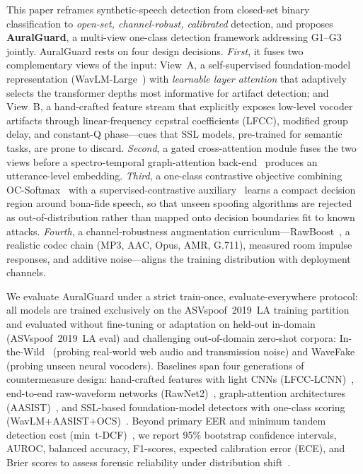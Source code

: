 This paper reframes synthetic-speech detection from closed-set binary classification to
\emph{open-set, channel-robust, calibrated} detection, and proposes
\textbf{AuralGuard}, a multi-view one-class detection framework addressing G1--G3
jointly. AuralGuard rests on four design decisions. \emph{First}, it fuses two
complementary views of the input: View~A, a self-supervised foundation-model
representation (WavLM-Large~\cite{chen2022wavlm}) with \emph{learnable layer attention}
that adaptively selects the transformer depths most informative for artifact detection;
and View~B, a hand-crafted feature stream that explicitly exposes low-level vocoder
artifacts through linear-frequency cepstral coefficients (LFCC), modified group delay,
and constant-Q phase---cues that SSL models, pre-trained for semantic tasks, are prone
to discard. \emph{Second}, a gated cross-attention module fuses the two views before a
spectro-temporal graph-attention back-end~\cite{jung2022aasist} produces an
utterance-level embedding. \emph{Third}, a one-class contrastive objective combining
OC-Softmax~\cite{zhang2021oneclass} with a supervised-contrastive
auxiliary~\cite{khosla2020supcon} learns a compact decision region around bona-fide
speech, so that unseen spoofing algorithms are rejected as out-of-distribution rather
than mapped onto decision boundaries fit to known attacks. \emph{Fourth}, a
channel-robustness augmentation curriculum---RawBoost~\cite{tak2022rawboost}, a
realistic codec chain (MP3, AAC, Opus, AMR, G.711), measured room impulse responses,
and additive noise---aligns the training distribution with deployment channels.

We evaluate AuralGuard under a strict train-once, evaluate-everywhere protocol: all models are trained exclusively on the ASVspoof~2019~LA training partition and evaluated without fine-tuning or adaptation on held-out in-domain (ASVspoof~2019~LA eval) and challenging out-of-domain zero-shot corpora: In-the-Wild~\cite{muller2022inthewild} (probing real-world web audio and transmission noise) and WaveFake~\cite{frank2021wavefake} (probing unseen neural vocoders). Baselines span four generations of countermeasure design: hand-crafted features with light CNNs (LFCC-LCNN)~\cite{lavrentyeva2019stc}, end-to-end raw-waveform networks (RawNet2)~\cite{tak2021rawnet2}, graph-attention architectures (AASIST)~\cite{jung2022aasist}, and SSL-based foundation-model detectors with one-class scoring (WavLM+AASIST+OCS)~\cite{chen2022wavlm,zhang2021oneclass}. Beyond primary EER and minimum tandem detection cost (min~t-DCF)~\cite{kinnunen2020tdcf}, we report 95\% bootstrap confidence intervals, AUROC, balanced accuracy, F1-scores, expected calibration error (ECE), and Brier scores to assess forensic reliability under distribution shift~\cite{oyucu2026generalization,nagar2026hybrid}.


